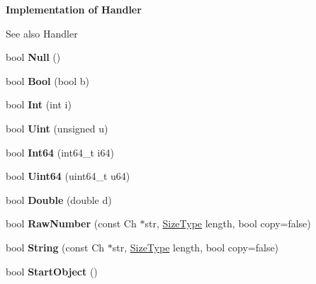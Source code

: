 \begin{Indent}{\bf Implementation of Handler}\par
{\em \begin{DoxySeeAlso}{See also}
Handler 
\end{DoxySeeAlso}
}\begin{DoxyCompactItemize}
\item 
bool {\bfseries Null} ()\hypertarget{a00232_aa144f2d0f0c3c69248cdbe957349528c}{}\label{a00232_aa144f2d0f0c3c69248cdbe957349528c}

\item 
bool {\bfseries Bool} (bool b)\hypertarget{a00232_a6e765ee7ada5ed40f317c78a98f6f90b}{}\label{a00232_a6e765ee7ada5ed40f317c78a98f6f90b}

\item 
bool {\bfseries Int} (int i)\hypertarget{a00232_aa1815263e61cb7af3b6dfba480a0f481}{}\label{a00232_aa1815263e61cb7af3b6dfba480a0f481}

\item 
bool {\bfseries Uint} (unsigned u)\hypertarget{a00232_a8c82302877a5588eae77eb7d042c49ef}{}\label{a00232_a8c82302877a5588eae77eb7d042c49ef}

\item 
bool {\bfseries Int64} (int64\+\_\+t i64)\hypertarget{a00232_ad42b797429f4ee19efdce610f5aff976}{}\label{a00232_ad42b797429f4ee19efdce610f5aff976}

\item 
bool {\bfseries Uint64} (uint64\+\_\+t u64)\hypertarget{a00232_aba75ac1f13c2629b2a55ffbf3d8a116c}{}\label{a00232_aba75ac1f13c2629b2a55ffbf3d8a116c}

\item 
bool {\bfseries Double} (double d)\hypertarget{a00232_ad9d592e86b985da666665926e87db415}{}\label{a00232_ad9d592e86b985da666665926e87db415}

\item 
bool {\bfseries Raw\+Number} (const Ch $\ast$str, \hyperlink{a00677_a5ed6e6e67250fadbd041127e6386dcb5}{Size\+Type} length, bool copy=false)\hypertarget{a00232_a3941bc21d6a261ca8a86eff330db30ef}{}\label{a00232_a3941bc21d6a261ca8a86eff330db30ef}

\item 
bool {\bfseries String} (const Ch $\ast$str, \hyperlink{a00677_a5ed6e6e67250fadbd041127e6386dcb5}{Size\+Type} length, bool copy=false)\hypertarget{a00232_ae544ccfe35dd7e80ed694873062409f6}{}\label{a00232_ae544ccfe35dd7e80ed694873062409f6}

\item 
bool {\bfseries Start\+Object} ()\hypertarget{a00232_a27bdda225dc152b8974e44c1df7525b7}{}\label{a00232_a27bdda225dc152b8974e44c1df7525b7}


\end{DoxyCompactItemize}
\end{Indent}
